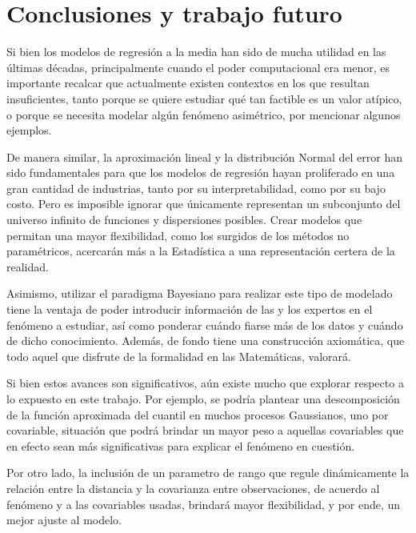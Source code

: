 \chapter[Conclusiones y trabajo futuro]{Conclusiones y trabajo futuro}

Si bien los modelos de regresi\'on a la media han sido de mucha utilidad en las \'ultimas d\'ecadas, principalmente cuando el poder computacional era menor, es importante recalcar que actualmente existen contextos en los que resultan insuficientes, tanto porque se quiere estudiar qu\'e tan factible es un valor at\'ipico, o porque se necesita modelar alg\'un fen\'omeno asim\'etrico, por mencionar algunos ejemplos.

De manera similar, la aproximaci\'on lineal y la distribuci\'on Normal del error han sido fundamentales para que los modelos de regresi\'on hayan proliferado en una gran cantidad de industrias, tanto por su interpretabilidad, como por su bajo costo. Pero es imposible ignorar que \'unicamente representan un subconjunto del universo infinito de funciones y dispersiones posibles. Crear modelos que permitan una mayor flexibilidad, como los surgidos de los m\'etodos no param\'etricos, acercar\'an m\'as a la Estad\'istica a una representaci\'on certera de la realidad.

Asimismo, utilizar el paradigma Bayesiano para realizar este tipo de modelado tiene la ventaja de poder introducir informaci\'on de las y los expertos en el fen\'omeno a estudiar, as\'i como ponderar cu\'ando fiarse m\'as de los datos y cu\'ando de dicho conocimiento. Adem\'as, de fondo tiene una construcci\'on axiom\'atica, que todo aquel que disfrute de la formalidad en las Matem\'aticas, valorar\'a.

Si bien estos avances son significativos, a\'un existe mucho que explorar respecto a lo expuesto en este trabajo. Por ejemplo, se podr\'ia plantear una descomposici\'on de la funci\'on aproximada del cuantil en muchos procesos Gaussianos, uno por covariable, situaci\'on que podr\'a brindar un mayor peso a aquellas covariables que en efecto sean m\'as significativas para explicar el fen\'omeno en cuesti\'on. 

Por otro lado, la inclusi\'on de un parametro de rango que regule din\'amicamente la relaci\'on entre la distancia y la covarianza entre observaciones, de acuerdo al fen\'omeno y a las covariables usadas, brindar\'a mayor flexibilidad, y por ende, un mejor ajuste al modelo.

\newpage 